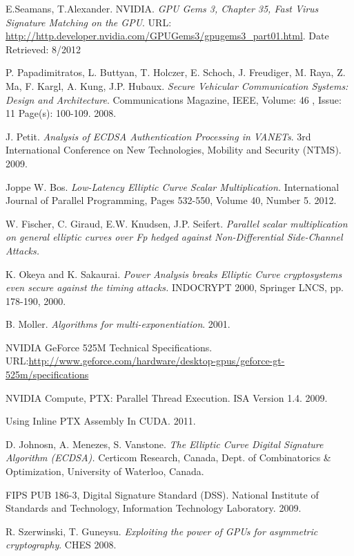 \documentclass[11pt,twocolumn]{IEEEtran}
\begin{document}
\begin{thebibliography}{9}

  E.Seamans, T.Alexander. NVIDIA. 
  \emph{GPU Gems 3, Chapter 35, Fast Virus Signature Matching on the GPU}.
  URL: \url{http://http.developer.nvidia.com/GPUGems3/gpugems3_part01.html}.
 Date Retrieved: 8/2012

P. Papadimitratos, L. Buttyan, T. Holczer, E. Schoch, J. Freudiger, M. Raya, Z. Ma, F. Kargl, A. Kung, J.P. Hubaux.
\emph{Secure Vehicular Communication
Systems: Design and Architecture}. Communications Magazine, IEEE, Volume: 46  , Issue: 11 
Page(s): 100-109. 2008.

J. Petit.
\emph{Analysis of ECDSA Authentication Processing in
VANETs}. 3rd International Conference on New Technologies, Mobility and Security (NTMS). 2009.

Joppe W. Bos.
\emph{Low-Latency Elliptic Curve Scalar Multiplication. } International Journal of Parallel Programming, Pages 532-550, Volume 40, Number 5. 2012.

W. Fischer, C. Giraud, E.W. Knudsen, J.P. Seifert.
\emph{Parallel scalar multiplication on general
elliptic curves over Fp hedged against Non-Differential Side-Channel Attacks.}


K. Okeya and K. Sakaurai. \emph{Power Analysis breaks Elliptic Curve cryptosystems
even secure against the timing attacks.} INDOCRYPT 2000, Springer LNCS, pp.
178-190, 2000.

B. Moller.
\emph{Algorithms for multi-exponentiation}. 2001.

NVIDIA GeForce 525M Technical Specifications. URL:\url{http://www.geforce.com/hardware/desktop-gpus/geforce-gt-525m/specifications}

NVIDIA Compute, PTX:  Parallel Thread Execution. ISA Version 1.4. 2009.

Using Inline PTX Assembly In CUDA. 2011.

D. Johnosn, A. Menezes, S. Vanstone.
\emph{The Elliptic Curve Digital Signature Algorithm (ECDSA).}
Certicom Research, Canada, Dept. of Combinatorics \& Optimization, University of Waterloo, Canada.

FIPS PUB 186-3, Digital Signature Standard (DSS).
National Institute of Standards and Technology, Information Technology Laboratory. 2009.

R. Szerwinski, T. Guneysu. \emph{Exploiting the power of GPUs for asymmetric cryptography}. CHES 2008.


\end{thebibliography}
\end{document}
